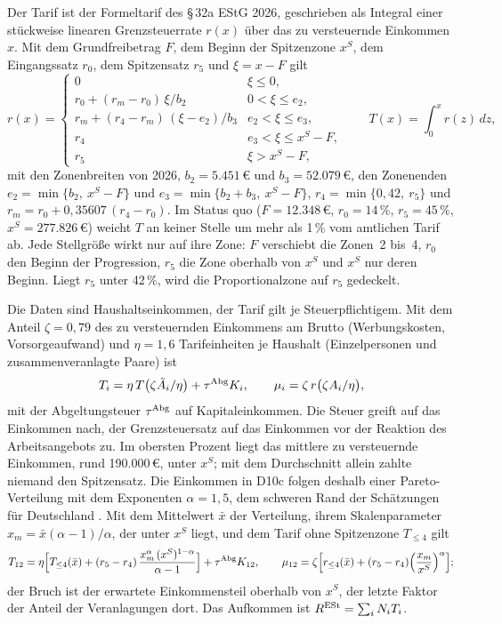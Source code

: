 Der Tarif ist der Formeltarif des §\,32a EStG 2026, geschrieben als Integral
einer stückweise linearen Grenzsteuerrate $r(x)$ über das zu versteuernde
Einkommen $x$. Mit dem Grundfreibetrag $F$, dem Beginn der Spitzenzone $x^S$,
dem Eingangssatz $r_0$, dem Spitzensatz $r_5$ und $\xi = x - F$ gilt
\begin{equation}
  r(x) = \begin{cases}
    0 & \xi \le 0,\\
    r_0 + (r_m - r_0)\,\xi/b_2 & 0 < \xi \le e_2,\\
    r_m + (r_4 - r_m)\,(\xi - e_2)/b_3 & e_2 < \xi \le e_3,\\
    r_4 & e_3 < \xi \le x^S - F,\\
    r_5 & \xi > x^S - F,
  \end{cases}
  \qquad T(x) = \int_0^x r(z)\,dz,
\end{equation}
mit den Zonenbreiten von 2026, $b_2 = 5.451$\,\euro{} und $b_3 = 52.079$\,\euro,
den Zonenenden $e_2 = \min\{b_2,\ x^S - F\}$ und
$e_3 = \min\{b_2 + b_3,\ x^S - F\}$, $r_4 = \min\{0{,}42,\ r_5\}$ und
$r_m = r_0 + 0{,}35607\,(r_4 - r_0)$. Im Status quo ($F = 12.348$\,\euro,
$r_0 = 14\,\%$, $r_5 = 45\,\%$, $x^S = 277.826$\,\euro) weicht $T$ an keiner
Stelle um mehr als 1\,\% vom amtlichen Tarif ab. Jede Stellgröße wirkt nur auf
ihre Zone: $F$ verschiebt die Zonen~2 bis~4, $r_0$ den Beginn der Progression,
$r_5$ die Zone oberhalb von $x^S$ und $x^S$ nur deren Beginn. Liegt $r_5$
unter 42\,\%, wird die Proportionalzone auf $r_5$ gedeckelt.

Die Daten sind Haushaltseinkommen, der Tarif gilt je Steuerpflichtigem. Mit
dem Anteil $\zeta = 0{,}79$ des zu versteuernden Einkommens am Brutto
(Werbungskosten, Vorsorgeaufwand) und $\eta = 1{,}6$ Tarifeinheiten je
Haushalt (Einzelpersonen und zusammenveranlagte Paare) ist
\begin{equation}
  T_i = \eta\,T\bigl(\zeta\tilde A_i/\eta\bigr) + \tau^{\mathrm{Abg}}K_i,
  \qquad \mu_i = \zeta\,r\bigl(\zeta A_i/\eta\bigr),
\end{equation}
mit der Abgeltungsteuer $\tau^{\mathrm{Abg}}$ auf Kapitaleinkommen. Die Steuer
greift auf das Einkommen nach, der Grenzsteuersatz auf das Einkommen vor der
Reaktion des Arbeitsangebots zu. Im obersten Prozent liegt das mittlere zu
versteuernde Einkommen, rund 190.000\,\euro, unter $x^S$; mit dem
Durchschnitt allein zahlte niemand den Spitzensatz. Die Einkommen in D10c
folgen deshalb einer Pareto-Verteilung mit dem Exponenten $\alpha = 1{,}5$,
dem schweren Rand der Schätzungen für Deutschland
\parencite{atkinson2011,bartels2015}. Mit dem Mittelwert $\bar x$ der
Verteilung, ihrem Skalenparameter $x_m = \bar x(\alpha-1)/\alpha$, der unter
$x^S$ liegt, und dem Tarif ohne Spitzenzone $T_{\le 4}$ gilt
\begin{equation}
  T_{12} = \eta\Bigl[T_{\le 4}(\bar x) + (r_5 - r_4)\,\frac{x_m^{\alpha}\,(x^S)^{1-\alpha}}{\alpha - 1}\Bigr] + \tau^{\mathrm{Abg}}K_{12},
  \qquad
  \mu_{12} = \zeta\Bigl[r_{\le 4}(\bar x) + (r_5 - r_4)\Bigl(\frac{x_m}{x^S}\Bigr)^{\alpha}\Bigr];
\end{equation}
der Bruch ist der erwartete Einkommensteil oberhalb von $x^S$, der letzte
Faktor der Anteil der Veranlagungen dort. Das Aufkommen ist
$R^{\mathrm{ESt}} = \sum_i N_i T_i$.

